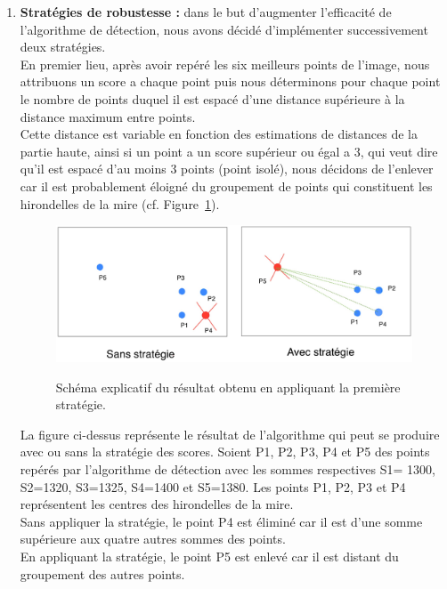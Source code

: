 \documentclass[12pt]{article}
\begin{document}
\begin{enumerate}
\item \textbf{Stratégies de robustesse : } dans le but d'augmenter l'efficacité de l'algorithme de détection,  
 nous avons décidé d'implémenter successivement deux stratégies.\\ 
 
En premier lieu, après avoir repéré les six meilleurs points de     
l'image, nous attribuons un score a chaque point  puis nous déterminons pour chaque point le nombre de points duquel il est espacé d'une distance supérieure à la distance maximum entre points.\\
Cette distance est variable en fonction des     
estimations de distances de la partie haute, ainsi si un point a un score supérieur ou égal a 3, qui veut dire qu'il est espacé d'au moins 3 points (point isolé), nous décidons de l'enlever car il est probablement éloigné du groupement de points qui constituent les hirondelles de la mire (cf. Figure~\ref{fig:strategie1}).\\

\begin{figure}[H]
    \centering
     {{\includegraphics[width=13cm]{B_strategie1.png} }}
    \caption{Schéma explicatif du résultat obtenu en appliquant la première stratégie.}
    \label{fig:strategie1}
\end{figure}

La figure ci-dessus représente le résultat de l'algorithme qui peut se produire avec ou sans la stratégie des scores.
Soient P1, P2, P3, P4 et P5 des points repérés par l'algorithme de détection avec les sommes respectives S1= 1300, S2=1320, S3=1325, S4=1400 et S5=1380. Les points P1, P2, P3 et P4 représentent les centres des hirondelles de la mire. \\Sans appliquer la stratégie, le point P4 est éliminé car il est d'une somme supérieure aux quatre autres sommes des points.\\
En appliquant la stratégie, le point P5 est enlevé car il est distant du groupement des autres points.\\



\end{enumerate}
\end{document}
